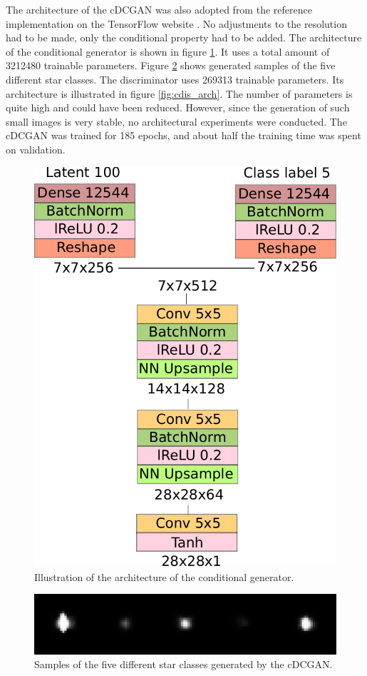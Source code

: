 \documentclass[10pt,conference,compsocconf]{IEEEtran}
\begin{document}
The architecture of the cDCGAN was also adopted from the reference implementation on the TensorFlow website \cite{dcgantf}. No adjustments to the resolution had to be made, only the conditional property had to be added. The architecture of the conditional generator is shown in figure \ref{fig:cgen_arch}. It uses a total amount of \SI{3212480}{} trainable parameters. Figure \ref{fig:clustered_generated_stars} shows generated samples of the five different star classes. The discriminator uses \SI{269313}{} trainable parameters. Its architecture is illustrated in figure \ref{fig:cdis_arch}. The number of parameters is quite high and could have been reduced. However, since the generation of such small images is very stable, no architectural experiments were conducted. The cDCGAN was trained for 185 epochs, and about half the training time was spent on validation.

\begin{figure}
    \centering
    \includegraphics[width=0.58\columnwidth]{assets/cgen_arch.pdf}
    \caption{Illustration of the architecture of the conditional generator.}
    \label{fig:cgen_arch}
\end{figure}

\begin{figure}[hb]
    \centering
    \includegraphics[width=\columnwidth]{assets/clustered_generated_stars_resized.png}
    \caption{Samples of the five different star classes generated by the cDCGAN.}
    \label{fig:clustered_generated_stars}
\end{figure}
\end{document}
